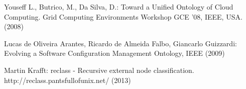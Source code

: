 Youseff L., Butrico, M., Da Silva, D.: Toward a Unified Ontology of Cloud Computing. Grid Computing Environments Workshop GCE '08, IEEE, USA. (2008)

Lucas de Oliveira Arantes, Ricardo de Almeida Falbo, Giancarlo Guizzardi: Evolving a Software Configuration Management Ontology, IEEE (2009)

Martin Krafft: reclass - Recursive external node classification. http://reclass.pantsfullofunix.net/ (2013)










